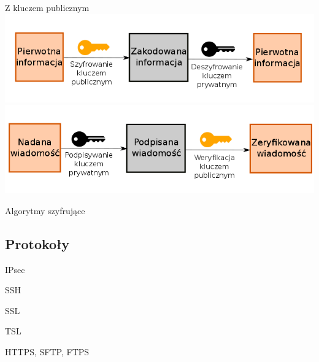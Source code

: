 \begin{frame}{Z kluczem publicznym}
		\includegraphics[height=0.25\paperwidth]{images/pub-key.png} \\
		\includegraphics[height=0.25\paperwidth]{images/pub-key-sign.png}
\end{frame}

\begin{frame}{Algorytmy szyfrujące}
	
\end{frame}

\subsection{Protokoły}

\begin{frame}{IPsec}
	
\end{frame}

\begin{frame}{SSH}
	
\end{frame}

\begin{frame}{SSL}
	
\end{frame}

\begin{frame}{TSL}
	
\end{frame}

\begin{frame}{HTTPS, SFTP, FTPS}
	
\end{frame}

